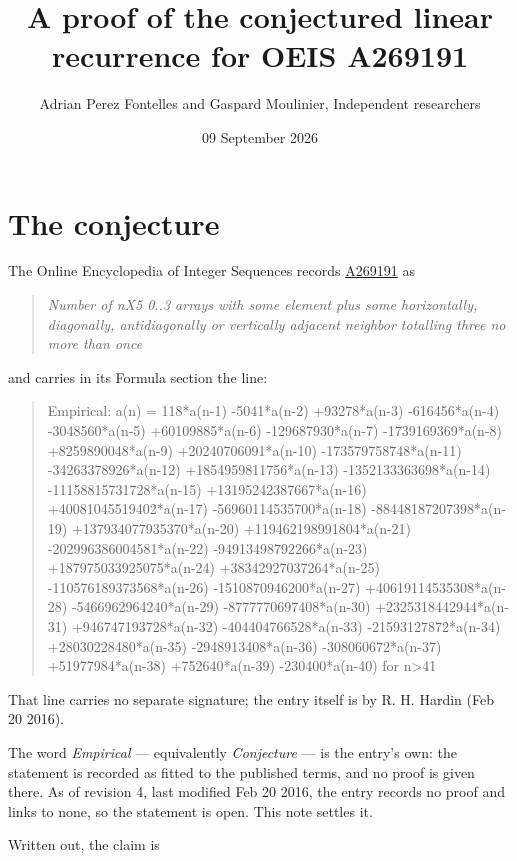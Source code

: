 \documentclass[11pt]{article}
\title{A proof of the conjectured linear recurrence for OEIS A269191}
\author{Adrian Perez Fontelles and Gaspard Moulinier, Independent researchers}
\date{09 September 2026}
\theoremstyle{definition}
\begin{document}
\maketitle
\section{The conjecture}

The Online Encyclopedia of Integer Sequences records \href{https://oeis.org/A269191}{A269191} as

\begin{quote}\itshape Number of nX5 0..3 arrays with some element plus some horizontally, diagonally, antidiagonally or vertically adjacent neighbor totalling three no more than once\end{quote}

and carries in its Formula section the line:

\begin{quote}\ttfamily Empirical: a(n) = 118*a(n-1) -5041*a(n-2) +93278*a(n-3) -616456*a(n-4) -3048560*a(n-5) +60109885*a(n-6) -129687930*a(n-7) -1739169369*a(n-8) +8259890048*a(n-9) +20240706091*a(n-10) -173579758748*a(n-11) -34263378926*a(n-12) +1854959811756*a(n-13) -1352133363698*a(n-14) -11158815731728*a(n-15) +13195242387667*a(n-16) +40081045519402*a(n-17) -56960114535700*a(n-18) -88448187207398*a(n-19) +137934077935370*a(n-20) +119462198991804*a(n-21) -202996386004581*a(n-22) -94913498792266*a(n-23) +187975033925075*a(n-24) +38342927037264*a(n-25) -110576189373568*a(n-26) -1510870946200*a(n-27) +40619114535308*a(n-28) -5466962964240*a(n-29) -8777770697408*a(n-30) +2325318442944*a(n-31) +946747193728*a(n-32) -404404766528*a(n-33) -21593127872*a(n-34) +28030228480*a(n-35) -2948913408*a(n-36) -308060672*a(n-37) +51977984*a(n-38) +752640*a(n-39) -230400*a(n-40) for n>41\end{quote}

That line carries no separate signature; the entry itself is by R. H. Hardin (Feb 20 2016).

The word {\itshape Empirical} --- equivalently {\itshape Conjecture} --- is the entry's own: the statement is recorded as fitted to the published terms, and no proof is given there. As of revision 4, last modified Feb 20 2016, the entry records no proof and links to none, so the statement is open. This note settles it.

Written out, the claim is
\end{document}
